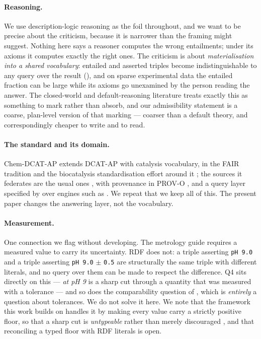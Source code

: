 \documentclass[11pt,a4paper]{article}
\theoremstyle{plain}
\theoremstyle{definition}
\theoremstyle{remark}
\begin{document}
\paragraph{Reasoning.} We use description-logic reasoning
\citep{Baader2003,Grau2008,Motik2009} as the foil throughout, and we
want to be precise about the criticism, because it is narrower than the
framing might suggest. Nothing here says a reasoner computes the wrong
entailments; under its axioms it computes exactly the right ones. The
criticism is about \emph{materialisation into a shared vocabulary}:
entailed and asserted triples become indistinguishable to any query over
the result (), and on sparse experimental data the
entailed fraction can be large while its axioms go unexamined by the
person reading the answer. The closed-world and default-reasoning
literature \citep{Reiter1978,Reiter1980} treats exactly this as
something to mark rather than absorb, and our admissibility statement is
a coarse, plan-level version of that marking --- coarser than a default
theory, and correspondingly cheaper to write and to read.

\paragraph{The standard and its domain.} Chem-DCAT-AP extends DCAT-AP
\citep{DCATAP2015,DCAT2020} with catalysis vocabulary, in the FAIR
tradition \citep{Wilkinson2016} and the biocatalysis standardisation
effort around it \citep{Doerr2020,Pleiss2021,Bornscheuer2012}; the
sources it federates are the usual ones
\citep{UniProt2023,Wittig2018,Chang2021,Hastings2016}, with provenance
in PROV-O \citep{PROVO2013}, and a query layer specified by
\citet{Harris2013} over engines such as \citet{Pyoxigraph}. We repeat
that we keep all of this. The present paper changes the answering layer,
not the vocabulary.

\paragraph{Measurement.} One connection we flag without developing. The
metrology guide \citep{GUM2008} requires a measured value to carry its
uncertainty. RDF does not: a triple asserting \texttt{pH 9.0} and a
triple asserting \texttt{pH 9.0} $\pm$ \texttt{0.5} are structurally the
same triple with different literals, and no query over them can be made
to respect the difference. Q4 sits directly on this --- \emph{at pH 9}
is a sharp cut through a quantity that was measured with a tolerance ---
and so does the comparability question of , which is
\emph{entirely} a question about tolerances. We do not solve it here. We
note that the framework this work builds on handles it by making every
value carry a strictly positive floor, so that a sharp cut is
\emph{untypeable} rather than merely discouraged
\citep{HegelFederated2026}, and that reconciling a typed floor with RDF
literals is open.
\end{document}
